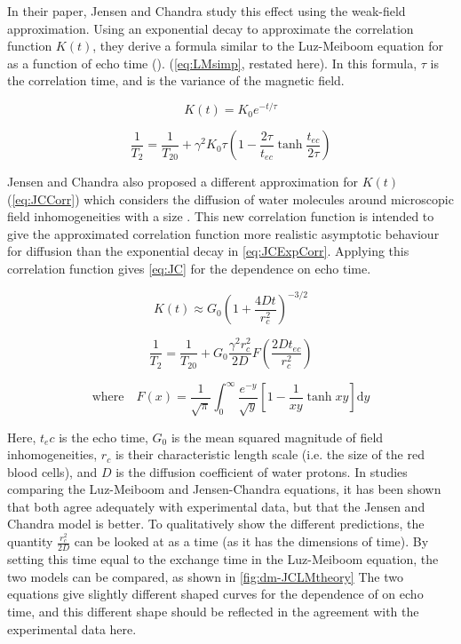 In their paper\cite{JensenNMRrelaxationtissues2000}, Jensen and Chandra study this effect using the weak-field approximation.
Using an exponential decay to approximate the correlation function $K(t)$, they derive a formula similar to the Luz-Meiboom equation for \Ttwo as a function of echo time (\Tech). (\autoref{eq:LMsimp}, restated here).
In this formula, $\tau$ is the correlation time, and \Kzero is the variance of the magnetic field.

\begin{displaymath}
K(t) = K_0 e^{-t/\tau}
\end{displaymath}

\begin{displaymath}
\frac{1}{T_2} = \frac{1}{T_{20}} + \gamma^2 K_0 \tau (1 - \frac{2\tau}{t_{ec}} \tanh{\frac{t_{ec}}{2\tau}})
\end{displaymath}

Jensen and Chandra also proposed a different approximation for $K(t)$ (\autoref{eq:JCCorr}) which considers the diffusion of water molecules around microscopic field inhomogeneities with a size \rc.
This new correlation function is intended to give the approximated correlation function more realistic asymptotic behaviour for diffusion than the exponential decay in \autoref{eq:JCExpCorr}.
Applying this correlation function gives \autoref{eq:JC} for the \Ttwo dependence on echo time.

\begin{equation}
K(t) \approx G_0 \left(1 + \frac{4Dt}{r_c^2}\right)^{-3/2}
\label{eq:JCCorr}
\end{equation}

\begin{equation}
\label{eq:JC}
\frac{1}{T_2} = \frac{1}{T_{20}}+ G_0 \frac{\gamma^2 r_c^2}{2D} F\left(\frac{2D t_{ec}}{r_c^2}\right)
\end{equation}

\begin{displaymath}
\mathrm{where } \quad F(x) = \frac{1}{\sqrt{\pi}} \int_0^\infty \frac{e^{-y}}{\sqrt{y}} \left[1-\frac{1}{xy} \tanh{xy}\right] \mathrm{d}y
\end{displaymath}

Here, $t_ec$ is the echo time, $G_0$ is the mean squared magnitude of field inhomogeneities, $r_c$ is their characteristic length scale (i.e. the size of the red blood cells), and $D$ is the diffusion coefficient of water protons.
In studies comparing the Luz-Meiboom and Jensen-Chandra equations, it has been shown that both agree adequately with experimental data, but that the Jensen and Chandra model is better.
To qualitatively show the different predictions, the quantity $\frac{r_c^2}{2D}$ can be looked at as a time (as it has the dimensions of time).
By setting this time equal to the exchange time in the Luz-Meiboom equation, the two models can be compared, as shown in \autoref{fig:dm-JCLMtheory}
The two equations give slightly different shaped curves for the dependence of \Ttwo on echo time, and this different shape should be reflected in the agreement with the experimental data here.

